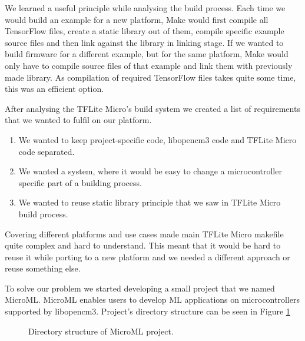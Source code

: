 We learned a useful principle while analysing the build process. 
Each time we would build an example for a new platform, Make would first compile all TensorFlow files, create a static library out of them, compile specific example source files and then link against the library in linking stage.
If we wanted to build firmware for a different example, but for the same platform, Make would only have to compile source files of that example and link them with previously made library.
As compilation of required TensorFlow files takes quite some time, this was an efficient option.

After analysing the TFLite Micro's build system we created a list of requirements that we wanted to fulfil on our platform.

\begin{enumerate}
    \item We wanted to keep project-specific code, libopencm3 code and TFLite Micro code separated.
    \item We wanted a system, where it would be easy to change a microcontroller specific part of a building process.
    \item We wanted to reuse static library principle that we saw in TFLite Micro build process.
\end{enumerate}

Covering different platforms and use cases made main TFLite Micro makefile quite complex and hard to understand.
This meant that it would be hard to reuse it while porting to a new platform and we needed a different approach or reuse something else.

To solve our problem we started developing a small project that we named MicroML\footnotemark.
MicroML enables users to develop ML applications on microcontrollers supported by libopencm3.
Project's directory structure can be seen in Figure \ref{microml_dir}
\begin{figure}[ht] 
    \centering
    \begin{minipage}{7cm}
    \end{minipage}
    \caption{ Directory structure of MicroML project.}
    \label{microml_dir}
\end{figure}

